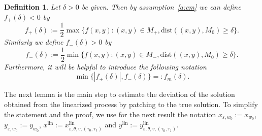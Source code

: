 \documentclass[12pt]{article}
\newtheorem{defn}[thm]{Definition}
\newcommand{\be}{\begin{equation}}
\newcommand{\ee}{\end{equation}}
\newcommand{\benn}{\begin{equation*}}
\newcommand{\eenn}{\end{equation*}}
\begin{document}
\begin{defn}
Let $\delta>0$ be given. Then by assumption~\ref{a:cm} we can 
define $f_+(\delta)<0$ by 
\benn
f_+(\delta):=\frac{1}{2}\max\{f(x,y): (x,y)\in M_+, 
\mathrm{dist}((x,y),M_0)\geq \delta\}.
\eenn
Similarly we define $f_-(\delta)>0$ by 
\benn
f_-(\delta):=\frac{1}{2}\min\{f(x,y): (x,y)\in M_-, 
\mathrm{dist}((x,y),M_0)\geq \delta\}.
\eenn
Furthermore, it will be helpful to introduce the following notation
\be
\min\{|f_+(\delta)|,f_-(\delta)\}=:f_m(\delta).
\ee
\end{defn} 

The next lemma is the main step to estimate the deviation of the solution
obtained from the linearized process by patching to the true solution.
To simplify the statement and the proof, we use for the
next result the notation $x_{\varepsilon,w_0}:=x_{w_0}$, 
$y_{\varepsilon,w_0}:=y_{w_0}$, $x^{\mathrm{lin}}:=
x^{\mathrm{lin}}_{\varepsilon,\theta,v,(\tau_0,\tau_1)}$ and 
$y^{\mathrm{lin}}:=y^{\mathrm{lin}}_{\varepsilon,\theta,v,(\tau_0,\tau_1)}$.
\end{document}
